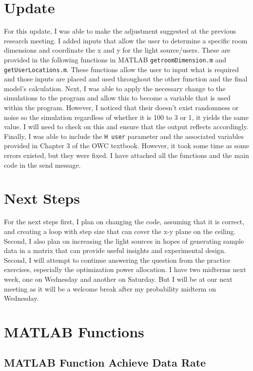 \section{Update}


For this update, I was able to make the adjustment suggested at the previous research meeting. I added inputs that allow the user to determine a specific room dimensions and coordinate the x and y for the light source/users. These are provided in the following functions in MATLAB \texttt{getroomDimension.m} and \texttt{getUserLocations.m}. These functions allow the user to input what is required and those inputs are placed and used throughout the other function and the final model's calculation. Next, I was able to apply the necessary change to the simulations to the program and allow this to become a variable that is used within the program. However, I noticed that their doesn't exist randomness or noise so the simulation regardless of whether it is 100 to 3 or 1, it yields the same value. I will need to check on this and ensure that the output reflects accordingly. Finally, I was able to include the \texttt{H user} parameter and the associated variables provided in Chapter 3 of the OWC textbook. However, it took some time as some errors existed, but they were fixed. I have attached all the functions and the main code in the send message. 




\section{Next Steps}


For the next steps first, I plan on changing the code, assuming that it is correct, and creating a loop with step size that can cover the x-y plane on the ceiling. Second, I also plan on increasing the light sources in hopes of generating sample data in a matrix that can provide useful insights and experimental design. Second, I will attempt to continue answering the question from the practice exercises, especially the optimization power allocation. I have two midterms next week, one on Wednesday and another on Saturday. But I will be at our next meeting as it will be a welcome break after my probability midterm on Wednesday. 

\section{MATLAB Functions}

\subsection{MATLAB Function Achieve Data Rate}

